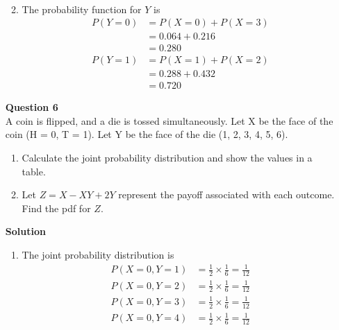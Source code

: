 \documentclass{uofa-eng-assignment}
\begin{document}
\begin{enumerate}
\begin{enumerate}
\begin{align*}
                  \end{align*}
            \item The probability function for $Y$ is
                  \begin{align*}
                      P(Y = 0) & = P(X = 0) + P(X = 3) \\
                               & = 0.064 + 0.216       \\
                               & = \boldsymbol{0.280}  \\
                      P(Y = 1) & = P(X = 1) + P(X = 2) \\
                               & = 0.288 + 0.432       \\
                               & = \boldsymbol{0.720}
                  \end{align*}
        \end{enumerate}
        \textbf{Question 6} \\
        A coin is flipped, and a die is tossed simultaneously. Let X be the face of the coin (H = 0, T = 1).
        Let Y be the face of the die (1, 2, 3, 4, 5, 6).
        \begin{enumerate}
            \item Calculate the joint probability distribution and show the values in a table.
            \item Let $Z = X - XY + 2Y$ represent the payoff associated with each outcome. Find
                  the pdf for $Z$.
        \end{enumerate}
        \textbf{Solution}
        \begin{enumerate}
            \item The joint probability distribution is
                  \begin{align*}
                      P(X = 0, Y = 1) & = \frac{1}{2}\times\frac{1}{6} = \frac{1}{12} \\
                      P(X = 0, Y = 2) & = \frac{1}{2}\times\frac{1}{6} = \frac{1}{12} \\
                      P(X = 0, Y = 3) & = \frac{1}{2}\times\frac{1}{6} = \frac{1}{12} \\
                      P(X = 0, Y = 4) & = \frac{1}{2}\times\frac{1}{6} = \frac{1}{12} \\

\end{align*}
\end{enumerate}
\end{enumerate}
\end{document}
